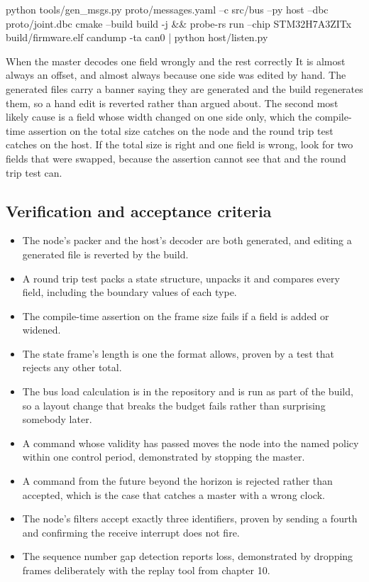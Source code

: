 \begin{shellcode}
python tools/gen_msgs.py proto/messages.yaml --c src/bus --py host --dbc proto/joint.dbc
cmake --build build -j && probe-rs run --chip STM32H7A3ZITx build/firmware.elf
candump -ta can0 | python host/listen.py
\end{shellcode}

\begin{note}{When the master decodes one field wrongly and the rest correctly}
It is almost always an offset, and almost always because one side was edited by
hand. The generated files carry a banner saying they are generated and the build
regenerates them, so a hand edit is reverted rather than argued about. The
second most likely cause is a field whose width changed on one side only, which
the compile-time assertion on the total size catches on the node and the round
trip test catches on the host. If the total size is right and one field is
wrong, look for two fields that were swapped, because the assertion cannot see
that and the round trip test can.
\end{note}

\subsection*{Verification and acceptance criteria}

\begin{itemize}
\item The node's packer and the host's decoder are both generated, and editing a
generated file is reverted by the build.
\item A round trip test packs a state structure, unpacks it and compares every
field, including the boundary values of each type.
\item The compile-time assertion on the frame size fails if a field is added or
widened.
\item The state frame's length is one the format allows, proven by a test that
rejects any other total.
\item The bus load calculation is in the repository and is run as part of the
build, so a layout change that breaks the budget fails rather than surprising
somebody later.
\item A command whose validity has passed moves the node into the named policy
within one control period, demonstrated by stopping the master.
\item A command from the future beyond the horizon is rejected rather than
accepted, which is the case that catches a master with a wrong clock.
\item The node's filters accept exactly three identifiers, proven by sending a
fourth and confirming the receive interrupt does not fire.
\item The sequence number gap detection reports loss, demonstrated by dropping
frames deliberately with the replay tool from chapter 10.
\end{itemize}

